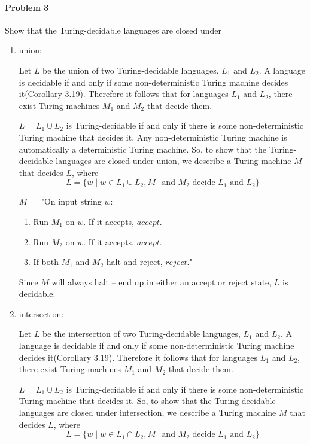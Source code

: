 \documentclass{article}
\begin{document}
\paragraph{Problem 3}
Show that the Turing-decidable languages are closed under
\begin{enumerate}[\indent a)]
    \item union: 
    
    Let $L$ be the union of two Turing-decidable languages, $L_1$ and $L_2$. A language is decidable if and only if some non-deterministic Turing machine decides it(Corollary 3.19). Therefore it follows that for languages $L_1$ and $L_2$, there exist Turing machines $M_1$ and $M_2$ that decide them.

$L = L_1 \cup L_2$ is Turing-decidable if and only if there is some non-deterministic Turing machine that decides it. Any non-deterministic Turing machine is automatically a deterministic Turing machine. So, to show that the Turing-decidable languages are closed under union, we describe a Turing machine $M$ that decides $L$, where
$$L = \{w \;|\;  w \in L_1\cup L_2, M_1 \text{ and  $M_2$ decide $L_1$ and $L_2$}\}$$

$M = $ "On input string $w$: 
    \begin{enumerate}[\indent 1.]
    \item Run $M_1$ on $w$. If it accepts, $accept$.
    \item Run $M_2$ on $w$. If it accepts, $accept$.
    \item If both $M_1$ and $M_2$ halt and reject, $reject$."
    \end{enumerate}
    
    
    Since $M$ will always halt -- end up in either an accept or reject state, $L$ is decidable.
    
    \item intersection: 
    
    Let $L$ be the intersection of two Turing-decidable languages, $L_1$ and $L_2$. A language is decidable if and only if some non-deterministic Turing machine decides it(Corollary 3.19). Therefore it follows that for languages $L_1$ and $L_2$, there exist Turing machines $M_1$ and $M_2$ that decide them.

$L = L_1 \cup L_2$ is Turing-decidable if and only if there is some non-deterministic Turing machine that decides it. So, to show that the Turing-decidable languages are closed under intersection, we describe a Turing machine $M$ that decides $L$, where
$$L = \{w \;|\;  w \in L_1\cap L_2, M_1 \text{ and  $M_2$ decide $L_1$ and $L_2$}\}$$


\end{enumerate}
\end{document}
